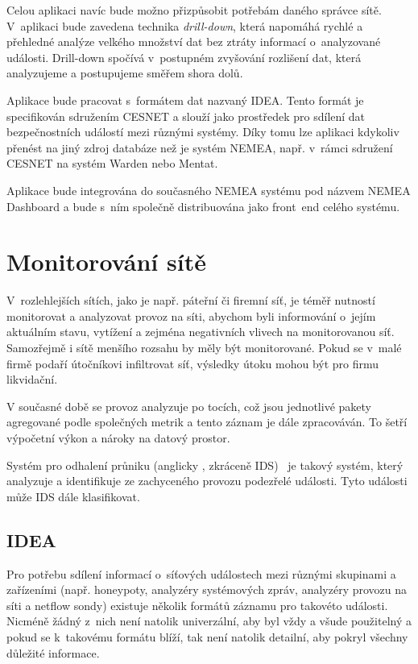 Celou aplikaci navíc bude možno přizpůsobit potřebám daného správce sítě. V~aplikaci bude zavedena technika {\it drill-down}, která napomáhá rychlé a přehledné analýze velkého množství dat bez ztráty informací o~analyzované události. Drill-down spočívá v~postupném zvyšování rozlišení dat, která analyzujeme a postupujeme směřem shora dolů.

Aplikace bude pracovat s~formátem dat nazvaný IDEA. Tento formát je specifikován sdružením CESNET a slouží jako prostředek pro sdílení dat bezpečnostních událostí mezi různými systémy. Díky tomu lze aplikaci kdykoliv přenést na jiný zdroj databáze než je systém NEMEA, např. v~rámci sdružení CESNET na systém Warden nebo Mentat.

Aplikace bude integrována do současného NEMEA systému pod názvem NEMEA Dashboard a bude s~ním společně distribuována jako front~end celého systému.

\chapter{Monitorování sítě}

V~rozlehlejších sítích, jako je např. páteřní či firemní síť, je téměř nutností monitorovat a analyzovat provoz na síti, abychom byli informování o~jejím aktuálním stavu, vytížení a zejména negativních vlivech na monitorovanou síť. Samozřejmě i sítě menšího rozsahu by měly být monitorované. Pokud se v~malé firmě podaří útočníkovi infiltrovat síť, výsledky útoku mohou být pro firmu likvidační.

V současné době se provoz analyzuje po tocích, což jsou jednotlivé pakety agregované podle společných metrik a tento záznam je dále zpracováván. To šetří výpočetní výkon a nároky na datový prostor.

Systém pro odhalení průniku (anglicky , zkráceně IDS)~\cite{idsips} je takový systém, který analyzuje a identifikuje ze zachyceného provozu podezřelé události. Tyto události může IDS dále klasifikovat. 

\section{IDEA}
\label{sec:idea}

Pro potřebu sdílení informací o~síťových událostech mezi různými skupinami a zařízeními (např. honeypoty, analyzéry systémových zpráv, analyzéry provozu na síti a netflow sondy) existuje několik formátů záznamu pro takovéto události. Nicméně žádný z~nich není natolik univerzální, aby byl vždy a všude použitelný a pokud se k~takovému formátu blíží, tak není natolik detailní, aby pokryl všechny důležité informace.

